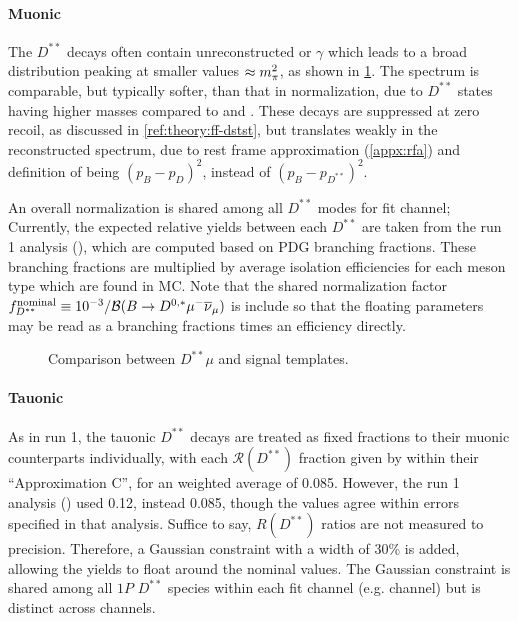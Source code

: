 \paragraph{Muonic}
The $D^{**}$ decays often contain unreconstructed \piz or $\gamma$ which leads
to a broad \mmSq distribution peaking at smaller values $\approx m^2_{\pi}$,
as shown in \cref{fig:dstst-mu-vs-d0-sig}.
The \el spectrum is comparable, but typically softer, than that in normalization,
due to $D^{**}$ states having higher masses compared to \Dz and \Dstar.
These decays are suppressed at zero recoil, as discussed in
\cref{ref:theory:ff-dstst},
but translates weakly in the reconstructed \qSq spectrum, due to rest frame
approximation (\cref{appx:rfa}) and definition of \qSq being
$(p_B - p_D)^2$, instead of $(p_B - p_{D^{**}})^2$.

An overall normalization is shared among all $D^{**}$ modes for \Dstar fit
channel;
Currently, the expected relative yields between each $D^{**}$ are
taken from the run 1 analysis (\cite{LHCb-ANA-2020-056}),
which are computed based on PDG branching fractions.
These branching fractions are multiplied by average isolation efficiencies
for each \B meson type which are found in MC.
Note that the shared normalization factor
$f^\text{nominal}_{D^{**}} \equiv 10^{-3} / \mathcal{B}(B \rightarrow D^{0,*}{\mu^-}{{\overline{\nu}}_\mu})$
is include so that the floating parameters may be read as a branching fractions
times an efficiency directly.

\begin{figure}[!htb]

    \caption{Comparison between $D^{**}\mu$ and \Dz\taum signal templates.}
    \label{fig:dstst-mu-vs-d0-sig}
\end{figure}

\paragraph{Tauonic}
As in run 1, the tauonic $D^{**}$ decays are treated as fixed fractions
to their muonic counterparts individually, with each $\mathcal{R}(D^{**})$
fraction given by \cite{Bernlochner_2018} within their ``Approximation C'',
for an weighted average of 0.085.
However, the run 1 \RDst analysis (\cite{LHCb-ANA-2014-052}) used
0.12, instead 0.085,
though the values agree within errors specified in that analysis.
Suffice to say, $R(D^{**})$ ratios are not measured to precision.
Therefore, a Gaussian constraint with a width of 30\% is added,
allowing the yields to float around the nominal values.
The Gaussian constraint is shared among all $1P$ $D^{**}$ species within
each fit channel (e.g. \Dz channel) but is distinct across channels.


